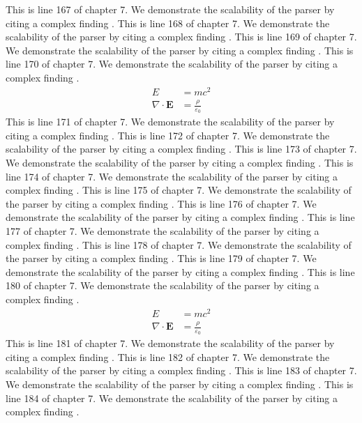 This is line 167 of chapter 7. We demonstrate the scalability of the parser by citing a complex finding \cite{ref7_167}.
This is line 168 of chapter 7. We demonstrate the scalability of the parser by citing a complex finding \cite{ref7_168}.
This is line 169 of chapter 7. We demonstrate the scalability of the parser by citing a complex finding \cite{ref7_169}.
This is line 170 of chapter 7. We demonstrate the scalability of the parser by citing a complex finding \cite{ref7_170}.
\begin{align*}
  E &= mc^2 \\
  \nabla \cdot \mathbf{E} &= \frac{\rho}{\varepsilon_0}
\end{align*}
This is line 171 of chapter 7. We demonstrate the scalability of the parser by citing a complex finding \cite{ref7_171}.
This is line 172 of chapter 7. We demonstrate the scalability of the parser by citing a complex finding \cite{ref7_172}.
This is line 173 of chapter 7. We demonstrate the scalability of the parser by citing a complex finding \cite{ref7_173}.
This is line 174 of chapter 7. We demonstrate the scalability of the parser by citing a complex finding \cite{ref7_174}.
This is line 175 of chapter 7. We demonstrate the scalability of the parser by citing a complex finding \cite{ref7_175}.
This is line 176 of chapter 7. We demonstrate the scalability of the parser by citing a complex finding \cite{ref7_176}.
This is line 177 of chapter 7. We demonstrate the scalability of the parser by citing a complex finding \cite{ref7_177}.
This is line 178 of chapter 7. We demonstrate the scalability of the parser by citing a complex finding \cite{ref7_178}.
This is line 179 of chapter 7. We demonstrate the scalability of the parser by citing a complex finding \cite{ref7_179}.
This is line 180 of chapter 7. We demonstrate the scalability of the parser by citing a complex finding \cite{ref7_180}.
\begin{align*}
  E &= mc^2 \\
  \nabla \cdot \mathbf{E} &= \frac{\rho}{\varepsilon_0}
\end{align*}
This is line 181 of chapter 7. We demonstrate the scalability of the parser by citing a complex finding \cite{ref7_181}.
This is line 182 of chapter 7. We demonstrate the scalability of the parser by citing a complex finding \cite{ref7_182}.
This is line 183 of chapter 7. We demonstrate the scalability of the parser by citing a complex finding \cite{ref7_183}.
This is line 184 of chapter 7. We demonstrate the scalability of the parser by citing a complex finding \cite{ref7_184}.
